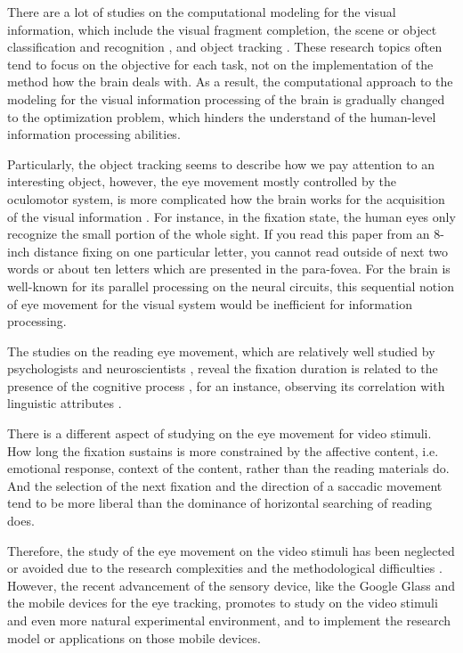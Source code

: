 \documentclass[10pt,letterpaper]{article}
\begin{document}
There are a lot of studies on the computational modeling for the visual information, which include the visual fragment completion, the scene or object classification and recognition \cite{winn2005,lazebnik2006}, and object tracking \cite{YiWu2013}. These research topics often tend to focus on the objective for each task, not on the implementation of the method how the brain deals with. As a result, the computational approach to the modeling for the visual information processing of the brain is gradually changed to the optimization problem, which hinders the understand of the human-level information processing abilities. 

Particularly, the object tracking seems to describe how we pay attention to an interesting object, however, the eye movement mostly controlled by the oculomotor system, is more complicated how the brain works for the acquisition of the visual information \cite{Henderson2003}. For instance, in the fixation state, the human eyes only recognize the small portion of the whole sight. If you read this paper from an 8-inch distance fixing on one particular letter, you cannot read outside of next two words or about ten letters which are presented in the para-fovea. For the brain is well-known for its parallel processing on the neural circuits, this sequential notion of eye movement for the visual system would be inefficient for information processing.

The studies on the reading eye movement, which are relatively well studied by psychologists and neuroscientists \cite{Rayner1998,Reichle1998}, reveal the fixation duration is related to the presence of the cognitive process \cite{Rayner1997}, for an instance, observing its correlation with linguistic attributes \cite{Inhoff1986,Rayner1986}.

There is a different aspect of studying on the eye movement for video stimuli. How long the fixation sustains is more constrained by the affective content, i.e. emotional response, context of the content, rather than the reading materials do. And the selection of the next fixation and the direction of a saccadic movement tend to be more liberal than the dominance of horizontal searching of reading does. 

Therefore, the study of the eye movement on the video stimuli has been neglected or avoided due to the research complexities and the methodological difficulties \cite{Tatler2011}. However, the recent advancement of the sensory device, like the Google Glass and the mobile devices for the eye tracking, promotes to study on the video stimuli and even more natural experimental environment, and to implement the research model or applications on those mobile devices. 
\end{document}
